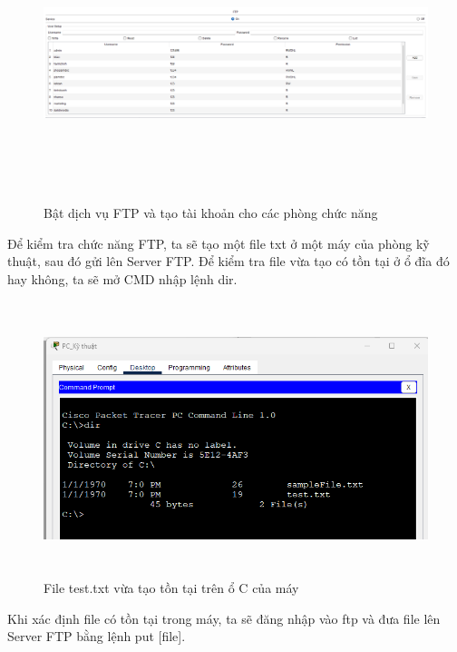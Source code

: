 \documentclass[a4paper, 12pt]{article}
\begin{document}
\begin{figure}[H]
    \centering
    \includegraphics[width=16cm, height=8cm]{img/4.2.3b.png}
    \caption{ Bật dịch vụ FTP và tạo tài khoản cho các phòng chức năng}
    \label{hinh423b}
\end{figure}
\hspace*{0.25cm}Để kiểm tra chức năng FTP, ta sẽ tạo một file txt ở một máy của phòng kỹ thuật, sau đó gửi lên Server FTP. Để kiểm tra file vừa tạo có tồn tại ở ổ đĩa đó hay không, ta sẽ mở CMD nhập lệnh dir.\\
\begin{figure}[H]
    \centering
    \includegraphics[width=16cm, height=8cm]{img/4.2.3c.png}
    \caption{File test.txt vừa tạo tồn tại trên ổ C của máy}
    \label{hinh423c}
\end{figure}
\hspace*{0.25cm}Khi xác định file có tồn tại trong máy, ta sẽ đăng nhập vào ftp và đưa file lên Server FTP bằng lệnh put [file].\\
\end{document}

